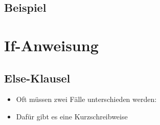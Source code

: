 \subsection*{Beispiel}
\begin{frame}
    \slidehead
    \vspace{-1em}
\end{frame}

\livecoding

\section{If-Anweisung}
\subsection{Else-Klausel}



\begin{frame}
    \slidehead
    \begin{itemize}
        \item Oft müssen zwei Fälle unterschieden werden:
            \vspace{0.58cm}
        \item Dafür gibt es eine Kurzschreibweise
    \end{itemize}
\end{frame}

